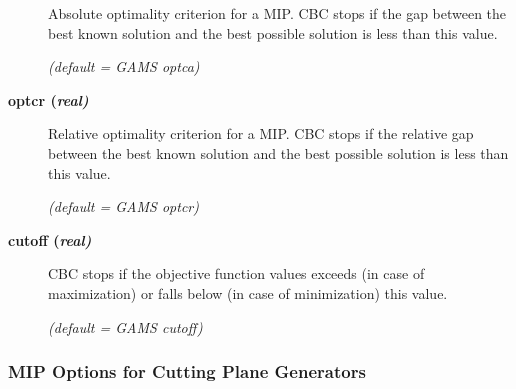 \begin{description}
Absolute optimality criterion for a MIP.
CBC stops if the gap between the best known solution and the best possible solution is less than this value.

\textsl{(default = GAMS optca)}

\item[\label{optcr}\hypertarget{optcr}
{\textbf{optcr (\slshape{real})}}]\hspace{1.0in}

Relative optimality criterion for a MIP.
CBC stops if the relative gap between the best known solution and the best possible solution is less than this value.

\textsl{(default = GAMS optcr)}

\item[\label{cutoff}\hypertarget{cutoff}
{\textbf{cutoff (\slshape{real})}}]\hspace{1.0in}

CBC stops if the objective function values exceeds (in case of maximization) or falls below (in case of minimization) this value.

\textsl{(default = GAMS cutoff)}

\end{description}

\subsubsection{MIP Options for Cutting Plane Generators}

